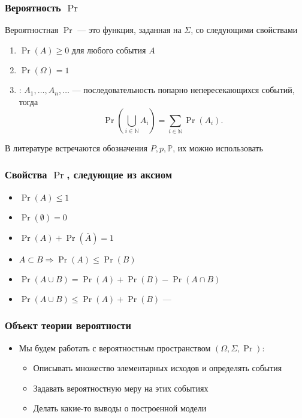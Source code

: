 \documentclass[hyperref=unicode,graphics=pdflatex,13pt,xcolor={usenames,dvipsnames}]{beamer}
\newcommand\hl[1]{{\color{blue}{#1}}}
\newcommand\pitem{\pause\item}
\newcommand\N{\mathbb{N}}
\begin{document}
\begin{frame}
  \frametitle{Вероятность $\Pr$}

  Вероятностная \hl{мера} $\Pr$ --- это функция, заданная на $\Sigma$, со следующими свойствами
  \begin{enumerate}
    \pitem \hl{Неотрицательность:} $\Pr(A) \ge 0$ для любого события $A$
    \pitem \hl{Нормализация:} $\Pr(\Omega) = 1$
    \pitem \hl{Счетная аддитивнотсь}: $A_1, \dots, A_n, \dots$ --- последовательность попарно непересекающихся событий, тогда
    \[
      \Pr\left(\bigcup\limits_{i \in \N} A_i\right) = \sum_{i \in \N} \Pr(A_i).
    \] 
  \end{enumerate}
  \hl{NB:} В литературе встречаются обозначения $P, p, \mathbb{P}$, их можно использовать
\end{frame}

\begin{frame}
  \frametitle{Свойства $\Pr$, следующие из аксиом}
  \begin{itemize}
    \item $\Pr(A) \le 1$
    \item $\Pr(\emptyset) = 0$
    \item $\Pr(A) + \Pr(\bar A) = 1$
    \item $A \subset B \Rightarrow \Pr(A) \le \Pr(B)$
    \item $\Pr(A \cup B) = \Pr(A) + \Pr(B) - \Pr(A \cap B)$
    \item $\Pr(A \cup B) \le \Pr(A) + \Pr(B)$ --- \hl{Union bound}
  \end{itemize}
\end{frame}

\begin{frame}
  \frametitle{Объект теории вероятности}
  \begin{itemize}
    \item Мы будем работать с вероятностным пространством $(\Omega, \Sigma, \Pr)$:
    \begin{itemize}
      \item Описывать множество элементарных исходов и определять события
      \item Задавать вероятностную меру на этих событиях
      \item Делать какие-то выводы о построенной модели
    \end{itemize}
  \end{itemize}
\end{frame}
\end{document}
